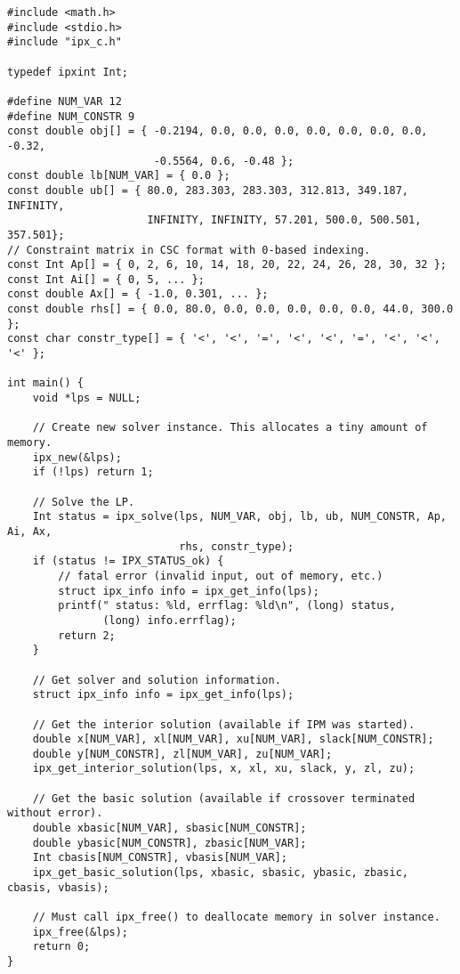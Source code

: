 \documentclass{article}
\begin{document}
\begin{verbatim}
#include <math.h>
#include <stdio.h>
#include "ipx_c.h"

typedef ipxint Int;

#define NUM_VAR 12
#define NUM_CONSTR 9
const double obj[] = { -0.2194, 0.0, 0.0, 0.0, 0.0, 0.0, 0.0, 0.0, -0.32,
                       -0.5564, 0.6, -0.48 };
const double lb[NUM_VAR] = { 0.0 };
const double ub[] = { 80.0, 283.303, 283.303, 312.813, 349.187, INFINITY,
                      INFINITY, INFINITY, 57.201, 500.0, 500.501, 357.501};
// Constraint matrix in CSC format with 0-based indexing.
const Int Ap[] = { 0, 2, 6, 10, 14, 18, 20, 22, 24, 26, 28, 30, 32 };
const Int Ai[] = { 0, 5, ... };
const double Ax[] = { -1.0, 0.301, ... };
const double rhs[] = { 0.0, 80.0, 0.0, 0.0, 0.0, 0.0, 0.0, 44.0, 300.0 };
const char constr_type[] = { '<', '<', '=', '<', '<', '=', '<', '<', '<' };

int main() {
    void *lps = NULL;

    // Create new solver instance. This allocates a tiny amount of memory.
    ipx_new(&lps);
    if (!lps) return 1;

    // Solve the LP.
    Int status = ipx_solve(lps, NUM_VAR, obj, lb, ub, NUM_CONSTR, Ap, Ai, Ax,
                           rhs, constr_type);
    if (status != IPX_STATUS_ok) {
        // fatal error (invalid input, out of memory, etc.)
        struct ipx_info info = ipx_get_info(lps);
        printf(" status: %ld, errflag: %ld\n", (long) status,
               (long) info.errflag);
        return 2;
    }

    // Get solver and solution information.
    struct ipx_info info = ipx_get_info(lps);

    // Get the interior solution (available if IPM was started).
    double x[NUM_VAR], xl[NUM_VAR], xu[NUM_VAR], slack[NUM_CONSTR];
    double y[NUM_CONSTR], zl[NUM_VAR], zu[NUM_VAR];
    ipx_get_interior_solution(lps, x, xl, xu, slack, y, zl, zu);

    // Get the basic solution (available if crossover terminated without error).
    double xbasic[NUM_VAR], sbasic[NUM_CONSTR];
    double ybasic[NUM_CONSTR], zbasic[NUM_VAR];
    Int cbasis[NUM_CONSTR], vbasis[NUM_VAR];
    ipx_get_basic_solution(lps, xbasic, sbasic, ybasic, zbasic, cbasis, vbasis);

    // Must call ipx_free() to deallocate memory in solver instance.
    ipx_free(&lps);
    return 0;
}
\end{verbatim}
\end{document}
